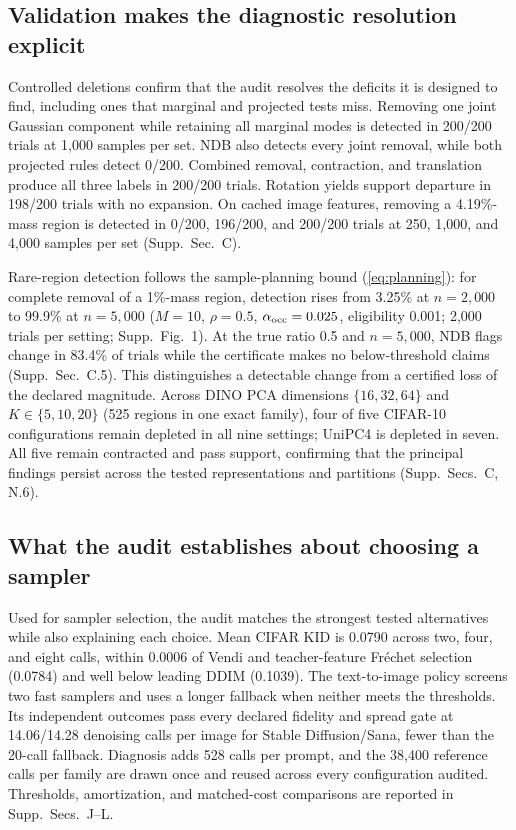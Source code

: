 \subsection{Validation makes the diagnostic resolution explicit}
\label{sec:supportcontrols}
Controlled deletions confirm that the audit resolves the deficits it is
designed to find, including ones that marginal and projected tests miss.
Removing one joint Gaussian component while retaining all marginal modes
is detected in 200/200 trials at 1,000 samples per set. NDB also detects
every joint removal, while both projected rules detect 0/200. Combined
removal, contraction, and translation produce all three labels in 200/200
trials. Rotation yields support departure in 198/200 trials with no
expansion. On cached image features, removing a 4.19\%-mass region is
detected in 0/200, 196/200, and 200/200 trials at 250, 1,000, and 4,000
samples per set (Supp.~Sec.~C).

Rare-region detection follows the sample-planning bound
(\cref{eq:planning}): for complete removal of a 1\%-mass region,
detection rises from 3.25\% at $n=2{,}000$ to 99.9\% at $n=5{,}000$
($M=10$, $\rho=0.5$, $\alpha_{\rm occ}=0.025$, eligibility 0.001;
2,000 trials per setting; Supp.~Fig.~1). At the true ratio 0.5 and
$n=5{,}000$, NDB flags change in 83.4\% of trials while the certificate
makes no below-threshold claims (Supp.~Sec.~C.5). This distinguishes a
detectable change from a certified loss of the declared magnitude. Across DINO PCA dimensions $\{16,32,64\}$ and $K\in\{5,10,20\}$
(525 regions in one exact family), four of five CIFAR-10 configurations
remain depleted in all nine settings; UniPC4 is depleted in seven.
All five remain contracted and pass support, confirming that the
principal findings persist across the tested representations and
partitions (Supp.~Secs.~C, N.6).

\subsection{What the audit establishes about choosing a sampler}
\label{sec:policy}
Used for sampler selection, the audit matches the strongest tested
alternatives while also explaining each choice. Mean CIFAR KID is 0.0790
across two, four, and eight calls, within 0.0006 of Vendi and
teacher-feature Fr\'echet selection (0.0784) and well below leading DDIM
(0.1039). The text-to-image policy
screens two fast samplers and uses a longer fallback when neither meets
the thresholds. Its independent outcomes pass every declared fidelity and spread gate
at 14.06/14.28 denoising calls per image for Stable Diffusion/Sana, fewer
than the 20-call fallback. Diagnosis adds 528 calls per prompt, and the
38,400 reference calls per family are drawn once and reused across every
configuration audited.
Thresholds, amortization, and matched-cost comparisons are reported in
Supp.~Secs.~J--L.
